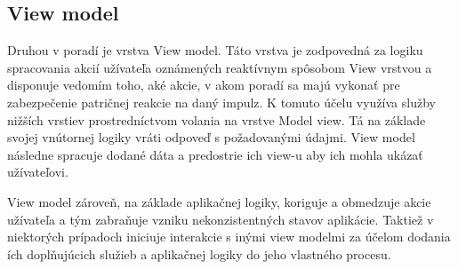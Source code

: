 \subsection{View model}

Druhou v poradí je vrstva View model. Táto vrstva je zodpovedná za logiku spracovania akcií užívateľa oznámených reaktívnym spôsobom View vrstvou a disponuje vedomím toho, aké akcie, v akom poradí sa majú vykonať pre zabezpečenie patričnej reakcie na daný impulz. K tomuto účelu využíva služby nižších vrstiev prostredníctvom volania na vrstve Model view. Tá na základe svojej vnútornej logiky vráti odpoveď s požadovanými údajmi. View model následne spracuje dodané dáta a predostrie ich view-u aby ich mohla ukázať užívateľovi.

View model zároveň, na základe aplikačnej logiky, koriguje a obmedzuje akcie užívateľa a tým zabraňuje vzniku nekonzistentných stavov aplikácie. Taktiež v niektorých prípadoch iniciuje interakcie s inými view modelmi za účelom dodania ích doplňujúcich služieb a aplikačnej logiky do jeho vlastného procesu.


